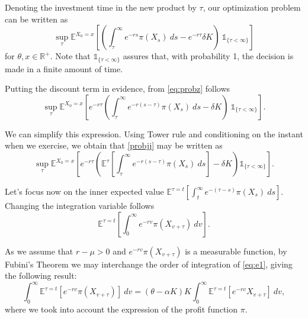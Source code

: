 

Denoting the investment time in the new product by $\tau$, our optimization problem can be written as 
\begin{equation}
\sup_\tau \mathds{E}^{X_0=x} \left[ \left( \int_\tau^\infty e^{-rs} \pi(X_s)\ ds - e^{-r \tau} \delta K \right) \ \mathds{1}_{\{\tau<\infty\}} \right]
\label{eq:probz}
\end{equation}
for $\theta, x\in \mathds{R}^+$. Note that $ \mathds{1}_{\{\tau<\infty\}}$ assures that, with probability 1, the decision is made in a finite amount of time.

Putting the discount term in evidence, from \eqref{eq:probz} follows
\begin{equation}
\sup_\tau \mathds{E}^{X_0=x} \left[e^{-r\tau }\left( \int_\tau^\infty e^{-r(s-\tau)} \pi(X_s)\ ds -\delta K \right) \ \mathds{1}_{\{\tau<\infty\}} \right].
\label{probjj}
\end{equation}

We can simplify this expression. Using Tower rule and conditioning on the instant when we exercise, we obtain that \eqref{probjj} may be written as
\begin{equation}
\sup_\tau \mathds{E}^{X_0=x}\left[ e^{- r\tau} \left( \mathds{E}^{\tau}\left[  \int_\tau^\infty e^{-r(s-\tau) }\pi(X_s)\ ds  \right] -\delta K\right) \mathds{1}_{\{\tau<\infty\}} \right].
\label{eq:probm}
\end{equation}

Let's focus now on the inner expected value $\mathds{E}^{\tau=t}\left[  \int_t^\infty e^{-(\tau-s) }\pi(X_s) \ ds  \right]$. Changing the integration variable follows
\begin{equation}
\mathds{E}^{\tau=t}\left[  \int_0^\infty e^{-rv }\pi(X_{v+\tau})\ dv  \right].
\label{eq:e1}
\end{equation}

As we assume that $r-\mu>0$ and $e^{-rv }\pi(X_{v+\tau})$ is a measurable function, by Fubini's Theorem we may interchange the order of integration of \eqref{eq:e1}, giving the following result:
\begin{equation}
\int_0^\infty\mathds{E}^{\tau=t}\left[   e^{-rv }\pi(X_{v+\tau}) \right]\ dv
= (\theta-\alpha K)K \int_0^\infty\mathds{E}^{\tau=t}\left[   e^{-rv } X_{v+\tau} \right]\ dv,
\label{eq:e2}
\end{equation}
where we took into account the expression of the profit function $\pi$.


